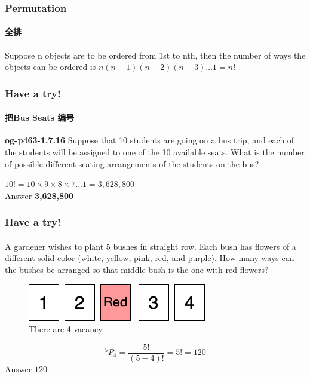 \documentclass[
	11pt, %
	handout,
]{beamer}
\begin{document}

\begin{frame}
	\frametitle{Permutation} %
	\framesubtitle{全排}
	\begin{definition}
		Suppose n objects are to be ordered from 1st to nth, then
 the number of ways the objects can be ordered is $n(n-1)(n-2)(n-3)\ldots1=n!$ 
	\end{definition}
\end{frame}


\begin{frame}
\frametitle{Have a try!}
\framesubtitle{把Bus Seats 编号}
\textbf{og-p463-1.7.16} Suppose that 10 students are going on a bus trip, and each
of the students will be assigned to one of the 10 available seats. What is  the
number of possible different seating arrangements of the students on the
bus?


\bigskip
\pause
$10! = 10 \times 9 \times 8 \times 7 \ldots 1 = 3,628,800  $\\
\bigskip\pause
Answer \textbf{3,628,800} \pause 
\end{frame}


\begin{frame}
	\frametitle{Have a try!}
	\framesubtitle{}
A gardener wishes to plant 5 bushes in straight row. Each bush has flowers of a
different solid color (white, yellow, pink, red, and purple). How many ways can the
bushes be arranged so that middle bush is the one with red flowers?
	\begin{figure}
		\includegraphics[width=0.3\linewidth]{Bushes.png}
		\caption{There are 4 vacancy.}
	\end{figure}
\begin{equation*}
	^5P_4 =\frac{5!}{(5-4)!} = 5! = 120
\end{equation*}
\bigskip
\pause
Answer \textbf{$120$}
\bigskip

\end{frame}

\end{document}
